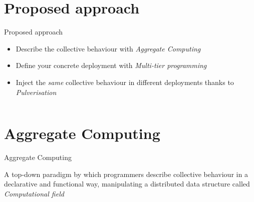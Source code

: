 \documentclass[aspectratio=169]{beamer}
\begin{document}
\section{Proposed approach}
\begin{frame}{Proposed approach}
  \begin{cardTiny}
    \begin{itemize}
      \item<1-> Describe the collective behaviour with {\color{accent} \textit{Aggregate Computing}~\cite{DBLP:journals/jlap/ViroliBDACP19}}
      \item<2-> Define your concrete deployment with {\color{accent} \textit{Multi-tier programming}~\cite{DBLP:journals/csur/WeisenburgerWS20}}
      \item<3-> Inject the {\color{accent} \textit{same}} collective behaviour in different deployments thanks to {\color{accent} \textit{Pulverisation}~\cite{DBLP:journals/fi/CasadeiPPVW20}}
    \end{itemize}
  \end{cardTiny}
  \begin{columns}[onlytextwidth, t]
    \begin{column}{0.27\textwidth}
      \begin{adjustbox}{max width=\textwidth, valign=m, margin=0}
      \end{adjustbox}
    \end{column}
    \begin{column}{0.32\textwidth}
      \begin{adjustbox}{max width=\textwidth, valign=m}
      \end{adjustbox}
    \end{column}
    \begin{column}{0.25\textwidth}
      \begin{adjustbox}{max width=\textwidth, valign=m}
      \end{adjustbox}
    \end{column}
  \end{columns}
\end{frame}
\section{Aggregate Computing}
\begin{frame}{Aggregate Computing~\cite{DBLP:journals/jlap/ViroliBDACP19}}
  \begin{cardTiny}
    {
      \color{accent} A top-down paradigm by which programmers describe 
      collective behaviour in a declarative and functional way,
      manipulating a distributed data structure called \textit{Computational field} 
    }
  \end{cardTiny}
  \centering
\end{frame}
\end{document}
